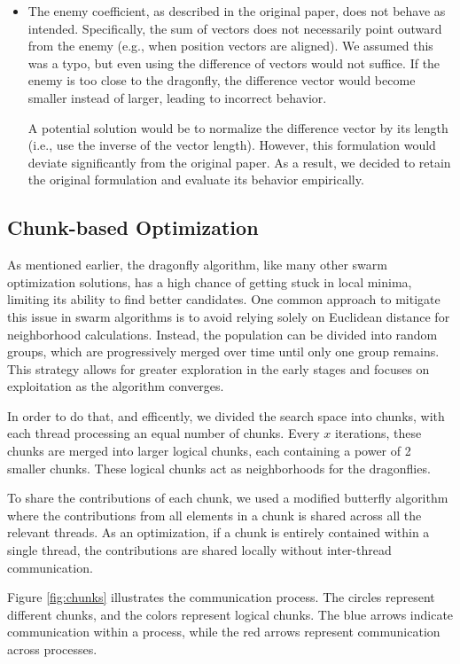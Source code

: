 \documentclass[10pt]{article}
\begin{document}
\begin{multicols}{2}
\begin{itemize}
  \item The enemy coefficient, as described in the original paper, does not behave as intended.
  Specifically, the sum of vectors does not necessarily point outward from the enemy (e.g., when position vectors are aligned).
  We assumed this was a typo, but even using the difference of vectors would not suffice.
  If the enemy is too close to the dragonfly, the difference vector would become smaller instead of larger, leading to incorrect behavior.

  A potential solution would be to normalize the difference vector by its length (i.e., use the inverse of the vector length).
  However, this formulation would deviate significantly from the original paper.
  As a result, we decided to retain the original formulation and evaluate its behavior empirically.

\end{itemize}


\subsection*{Chunk-based Optimization}
\label{chunks}
As mentioned earlier, the dragonfly algorithm, like many other swarm optimization solutions, has a high chance of getting stuck in local minima, limiting its ability to find better candidates.
One common approach to mitigate this issue in swarm algorithms is to avoid relying solely on Euclidean distance for neighborhood calculations.
Instead, the population can be divided into random groups, which are progressively merged over time until only one group remains.
This strategy allows for greater exploration in the early stages and focuses on exploitation as the algorithm converges.

In order to do that, and efficently, we divided the search space into chunks, with each thread processing an equal number of chunks.
Every $x$ iterations, these chunks are merged into larger logical chunks, each containing a power of 2 smaller chunks.
These logical chunks act as neighborhoods for the dragonflies. 

To share the contributions of each chunk, we used a modified butterfly algorithm where the contributions from all elements in a chunk is shared across all the relevant threads.
As an optimization, if a chunk is entirely contained within a single thread, the contributions are shared locally without inter-thread communication. 

Figure \ref{fig:chunks} illustrates the communication process.
The circles represent different chunks, and the colors represent logical chunks.
The blue arrows indicate communication within a process, while the red arrows represent communication across processes.


\end{multicols}
\end{document}
